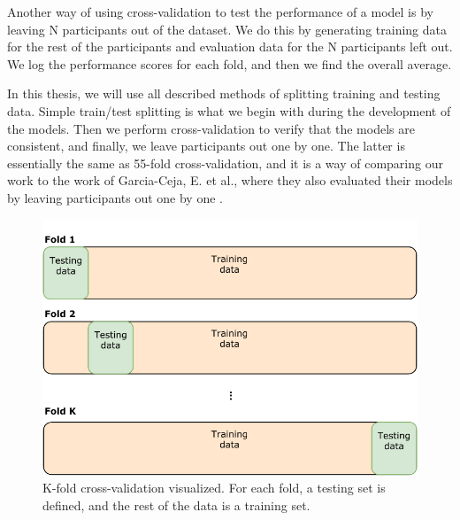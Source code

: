 Another way of using cross-validation to test the performance of a model is by leaving N participants out of the dataset. We do this by generating training data for the rest of the participants and evaluation data for the N participants left out. We log the performance scores for each fold, and then we find the overall average. 

In this thesis, we will use all described methods of splitting training and testing data. Simple train/test splitting is what we begin with during the development of the models. Then we perform cross-validation to verify that the models are consistent, and finally, we leave participants out one by one. The latter is essentially the same as 55-fold cross-validation, and it is a way of comparing our work to the work of Garcia-Ceja, E. et al., where they also evaluated their models by leaving participants out one by one \cite{GarciaCeja2018_classification_bipolar}. 

\begin{figure}
\begin{center}
  \includegraphics{img/Cross-validation.pdf}
  \caption{K-fold cross-validation visualized. For each fold, a testing set is defined, and the rest of the data is a training set.}
  \label{figure:dataset_cross_val}
\end{center}  
\end{figure}